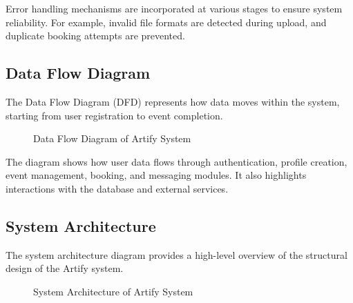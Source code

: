\documentclass[12pt,a4paper]{report}
\begin{document}
Error handling mechanisms are incorporated at various stages to ensure system reliability. For example, invalid file formats are detected during upload, and duplicate booking attempts are prevented.

\subsection*{Data Flow Diagram}

The Data Flow Diagram (DFD) represents how data moves within the system, starting from user registration to event completion.

\begin{figure}[H]
\centering
\caption{Data Flow Diagram of Artify System}
\label{fig:dfd}
\end{figure}

The diagram shows how user data flows through authentication, profile creation, event management, booking, and messaging modules. It also highlights interactions with the database and external services.

\subsection*{System Architecture}

The system architecture diagram provides a high-level overview of the structural design of the Artify system.

\begin{figure}[H]
\centering
\caption{System Architecture of Artify System}
\label{fig:architecture}
\end{figure}
\end{document}
